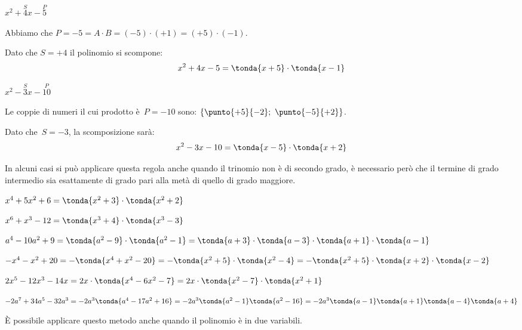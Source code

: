 
\begin{esempio}
 \(x^{2}+\overset{S}{4}x-\overset{P}{5}\)

Abbiamo che \(P = -5 = A \cdot B = (-5) \cdot (+1) = (+5) \cdot (-1)\).

Dato che \(S = +4\) il polinomio si scompone:
\[x^{2}+4x-5=\tonda{x+5}\cdot \tonda{x-1}\]
\end{esempio}

\begin{esempio}
 \(x^{2}-\overset{S}{3}x-\overset{P}{10}\)

Le coppie di numeri il cui prodotto è~\(P=-10\) sono:
\(\{\punto{+5}{-2};~\punto{-5}{+2}\}\).

Dato che~\(S=-3\), la scomposizione sarà:
\[x^{2}-3x-10=\tonda{x-5}\cdot \tonda{x+2}\]
\end{esempio}

\begin{esempio}
 In alcuni casi si può applicare questa regola anche quando il trinomio
non è di secondo grado, è necessario però che il termine di grado
intermedio sia esattamente di grado pari alla metà di quello di grado
maggiore.

\begin{itemize*}
\item \(x^{4}+5x^{2}+6=\tonda{x^{2}+3}\cdot \tonda{x^{2}+2}\)
\item \(x^{6}+x^{3}-12=\tonda{x^{3}+4}\cdot \tonda{x^{3}-3}\)
\item \(a^{4}-10a^{2}+9=\tonda{a^{2}-9}\cdot\tonda{a^{2}-1}=
       \tonda{a+3}\cdot \tonda{a-3}\cdot 
       \tonda{a+1}\cdot\tonda{a-1}\)
\item \(-x^{4}-x^{2}+20=-\tonda{x^{4}+x^{2}-20}=
       -\tonda{x^{2}+5}\cdot\tonda{x^{2}-4}=
       -\tonda{x^{2}+5}\cdot\tonda{x+2}\cdot \tonda{x-2}\)
\item \(2x^{5}-12x^{3}-14x=2x\cdot \tonda{x^{4}-6x^{2}-7}=2x\cdot%
\tonda{x^{2}-7}\cdot \tonda{x^{2}+1}\)
\item \(-2a^{7}+34a^{5}-32a^{3}=-2a^{3}\tonda{a^{4}-17a^{2}+16}
    =-2a^{3}\tonda{a^{2}-1}\tonda{a^{2}-16}\\
=-2a^{3}\tonda{a-1}\tonda{a+1}\tonda{a-4}\tonda{a+4}\)
\end{itemize*}
\end{esempio}


È possibile applicare questo metodo anche quando il
polinomio è in due variabili.

